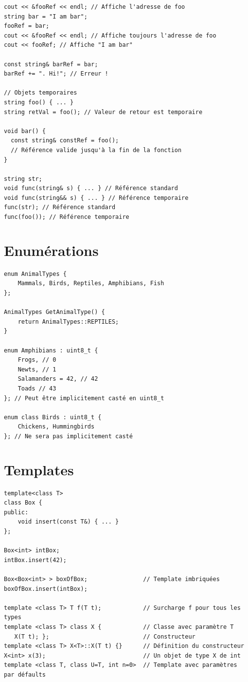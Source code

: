 \documentclass{article}
\begin{document}
\begin{multicols*}{3}
\begin{lstlisting}
cout << &fooRef << endl; // Affiche l'adresse de foo
string bar = "I am bar";
fooRef = bar;
cout << &fooRef << endl; // Affiche toujours l'adresse de foo
cout << fooRef; // Affiche "I am bar"

const string& barRef = bar;
barRef += ". Hi!"; // Erreur !

// Objets temporaires
string foo() { ... }
string retVal = foo(); // Valeur de retour est temporaire

void bar() {
  const string& constRef = foo();
  // Référence valide jusqu'à la fin de la fonction
}

string str;
void func(string& s) { ... } // Référence standard
void func(string&& s) { ... } // Référence temporaire
func(str); // Référence standard
func(foo()); // Référence temporaire

\end{lstlisting}

\section*{Enumérations}

\begin{lstlisting}
enum AnimalTypes {
    Mammals, Birds, Reptiles, Amphibians, Fish
};

AnimalTypes GetAnimalType() {
    return AnimalTypes::REPTILES;
}

enum Amphibians : uint8_t {
    Frogs, // 0
    Newts, // 1
    Salamanders = 42, // 42
    Toads // 43
}; // Peut être implicitement casté en uint8_t

enum class Birds : uint8_t {
    Chickens, Hummingbirds
}; // Ne sera pas implicitement casté
\end{lstlisting}

\section*{Templates}

\begin{lstlisting}
template<class T>
class Box {
public:
    void insert(const T&) { ... }
};

Box<int> intBox;
intBox.insert(42);

Box<Box<int> > boxOfBox;                // Template imbriquées
boxOfBox.insert(intBox);

template <class T> T f(T t);            // Surcharge f pour tous les types
template <class T> class X {            // Classe avec paramètre T
   X(T t); };                           // Constructeur
template <class T> X<T>::X(T t) {}      // Définition du constructeur
X<int> x(3);                            // Un objet de type X de int
template <class T, class U=T, int n=0>  // Template avec paramètres par défaults


\end{lstlisting}
\end{multicols*}
\end{document}
